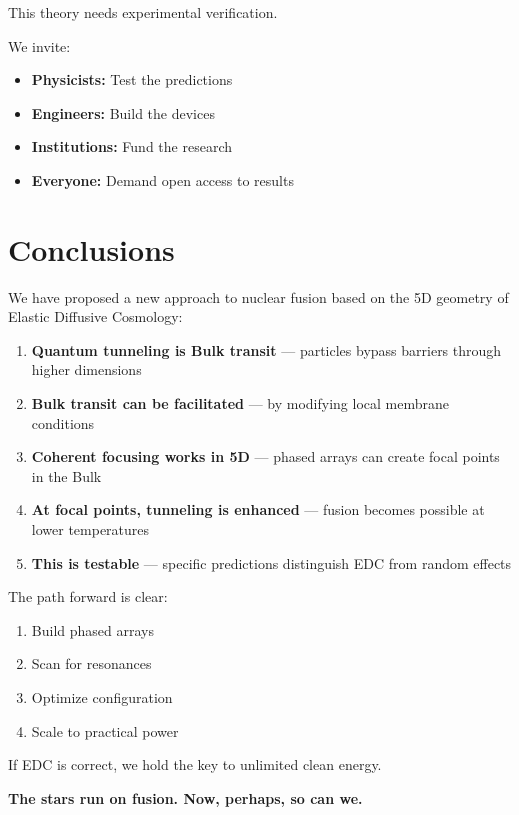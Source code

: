 \documentclass[12pt,a4paper]{article}
\begin{document}
This theory needs experimental verification.

We invite:
\begin{itemize}
    \item \textbf{Physicists:} Test the predictions
    \item \textbf{Engineers:} Build the devices
    \item \textbf{Institutions:} Fund the research
    \item \textbf{Everyone:} Demand open access to results
\end{itemize}

\section{Conclusions}

We have proposed a new approach to nuclear fusion based on the 5D geometry of Elastic Diffusive Cosmology:

\begin{enumerate}
    \item \textbf{Quantum tunneling is Bulk transit} --- particles bypass barriers through higher dimensions
    \item \textbf{Bulk transit can be facilitated} --- by modifying local membrane conditions
    \item \textbf{Coherent focusing works in 5D} --- phased arrays can create focal points in the Bulk
    \item \textbf{At focal points, tunneling is enhanced} --- fusion becomes possible at lower temperatures
    \item \textbf{This is testable} --- specific predictions distinguish EDC from random effects
\end{enumerate}

The path forward is clear:
\begin{enumerate}
    \item Build phased arrays
    \item Scan for resonances
    \item Optimize configuration
    \item Scale to practical power
\end{enumerate}

\begin{keyresult}
If EDC is correct, we hold the key to unlimited clean energy.

\textbf{The stars run on fusion. Now, perhaps, so can we.}
\end{keyresult}
\end{document}
